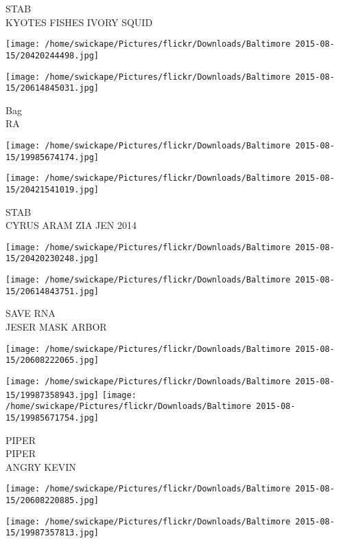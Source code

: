 \documentclass[10pt,letterpaper]{article}
\begin{document}
STAB\\
KYOTES FISHES IVORY SQUID\\
\pagebreak

\texttt{[image: /home/swickape/Pictures/flickr/Downloads/Baltimore 2015-08-15/20420244498.jpg]}

\vspace{0.25in}
\texttt{[image: /home/swickape/Pictures/flickr/Downloads/Baltimore 2015-08-15/20614845031.jpg]}

Bag\\
RA\\
\pagebreak

\texttt{[image: /home/swickape/Pictures/flickr/Downloads/Baltimore 2015-08-15/19985674174.jpg]}

\vspace{0.25in}
\texttt{[image: /home/swickape/Pictures/flickr/Downloads/Baltimore 2015-08-15/20421541019.jpg]}

STAB\\
CYRUS ARAM ZIA JEN 2014\\
\pagebreak

\texttt{[image: /home/swickape/Pictures/flickr/Downloads/Baltimore 2015-08-15/20420230248.jpg]}

\vspace{0.25in}
\texttt{[image: /home/swickape/Pictures/flickr/Downloads/Baltimore 2015-08-15/20614843751.jpg]}

SAVE RNA\\
JESER MASK ARBOR\\
\pagebreak

\texttt{[image: /home/swickape/Pictures/flickr/Downloads/Baltimore 2015-08-15/20608222065.jpg]}

\vspace{0.25in}
\texttt{[image: /home/swickape/Pictures/flickr/Downloads/Baltimore 2015-08-15/19987358943.jpg]}
\texttt{[image: /home/swickape/Pictures/flickr/Downloads/Baltimore 2015-08-15/19985671754.jpg]}

PIPER\\
PIPER\\
ANGRY KEVIN\\
\pagebreak

\texttt{[image: /home/swickape/Pictures/flickr/Downloads/Baltimore 2015-08-15/20608220885.jpg]}

\vspace{0.25in}
\texttt{[image: /home/swickape/Pictures/flickr/Downloads/Baltimore 2015-08-15/19987357813.jpg]}
\end{document}

